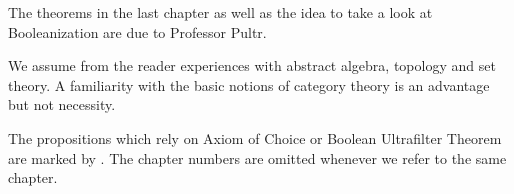 The theorems in the last chapter as well as the idea to take a look at Booleanization are due to Professor Pultr.

We assume from the reader experiences with abstract algebra, topology and set theory.
A familiarity with the basic notions of category theory is an advantage but not necessity.

The propositions which rely on Axiom of Choice or Boolean Ultrafilter Theorem are marked by  \ACPStar{}.
The chapter numbers are omitted whenever we refer to the same chapter.
